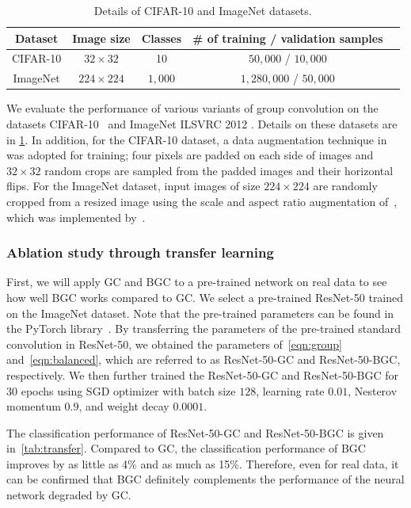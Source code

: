 \documentclass[preprint,12pt,authoryear]{elsarticle}
\numberwithin{equation}{section}
\theoremstyle{remark}
\begin{document}
\begin{table}
  \centering
  \caption{Details of CIFAR-10 and ImageNet datasets.}
  \label{tab:data}
  \begin{tabular}{ccccc}
  \toprule
  Dataset  & Image size & Classes & \# of training / validation samples \\ \midrule
  CIFAR-10 & $32 \times 32$ & 10 & $50{,}000$ / $10{,}000$ \\
  ImageNet & $224 \times 224$ & $1{,}000$ & $1{,}280{,}000$ / $50{,}000$ \\ \bottomrule
  \end{tabular}
\end{table}

We evaluate the performance of various variants of group convolution on the datasets CIFAR-10~\citep{krizhevsky2009learning} and ImageNet ILSVRC 2012 \citep{deng2009imagenet}.
Details on these datasets are in \cref{tab:data}.
In addition, for the CIFAR-10 dataset, a data augmentation technique in~\citep{lee2015deeply} was adopted for training; four pixels are padded on each side of images and $32 \times 32$ random crops are sampled from the padded images and their horizontal flips.
For the ImageNet dataset, input images of size $224 \times 224$ are randomly cropped from a resized image using the scale and aspect ratio augmentation of~\citep{szegedy2015going}, which was implemented by~\citep{gross2016training}.

\subsubsection{Ablation study through transfer learning}
First, we will apply GC and BGC to a pre-trained network on real data to see how well BGC works compared to GC.
We select a pre-trained ResNet-50 trained on the ImageNet dataset.
Note that the pre-trained parameters can be found in the PyTorch library~\citep{paszke2019pytorch}.
By transferring the parameters of the pre-trained standard convolution in ResNet-50, we obtained the parameters of~\eqref{eqn:group} and~\eqref{eqn:balanced}, which are referred to as ResNet-50-GC and ResNet-50-BGC, respectively.
We then further trained the ResNet-50-GC and ResNet-50-BGC for $30$ epochs using SGD optimizer with batch size $128$, learning rate $0.01$, Nesterov momentum $0.9$, and weight decay $0.0001$.

The classification performance of ResNet-50-GC and ResNet-50-BGC is given in~\cref{tab:transfer}.
Compared to GC, the classification performance of BGC improves by as little as 4\% and as much as 15\%.
Therefore, even for real data, it can be confirmed that BGC definitely complements the performance of the neural network degraded by GC.
\end{document}
